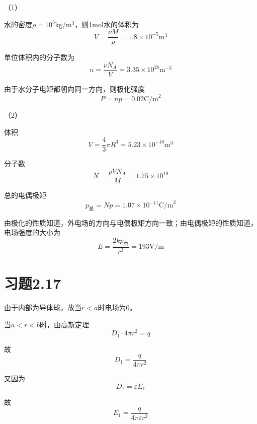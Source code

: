 \documentclass{SCIS2020cn}
\begin{document}
（1）

水的密度$\rho=10^3$kg/$\text{m}^3$，则1mol水的体积为
\begin{equation}
    V=\frac{\nu{}M}{\rho}=1.8×10^{-5}\text{m}^3
\end{equation}

单位体积内的分子数为
\begin{equation}
    n=\frac{\nu{}N_A}{V}=3.35×10^{28}\text{m}^{-3}
\end{equation}

由于水分子电矩都朝向同一方向，则极化强度
\begin{equation}
    P=np=0.02\text{C/m}^2
\end{equation}

（2）

体积
\begin{equation}
    V=\frac{4}{3}\pi{}R^3=5.23×10^{-10}\text{m}^3
\end{equation}

分子数
\begin{equation}
    N=\frac{\rho{}VN_A}{M}=1.75×10^{19}
\end{equation}

总的电偶极矩
\begin{equation}
    p_{\text{总}}=Np=1.07×10^{-11}\text{C/m}^2
\end{equation}

由极化的性质知道，外电场的方向与电偶极矩方向一致；由电偶极矩的性质知道，电场强度的大小为
\begin{equation}
    E=\frac{2kp_{\text{总}}}{r^3}=193\text{V/m}
\end{equation}

\section{习题2.17}
由于内部为导体球，故当$r<a$时电场为0。

当$a<r<b$时，由高斯定理
\begin{equation}
    D_1·4\pi{}r^2=q
\end{equation}

故
\begin{equation}
    D_1=\frac{q}{4\pi{}r^2}
\end{equation}

又因为
\begin{equation}
    D_1=\varepsilon{}E_1
\end{equation}

故
\begin{equation}
    E_1=\frac{q}{4\pi\varepsilon{}r^2}
\end{equation}
\end{document}
